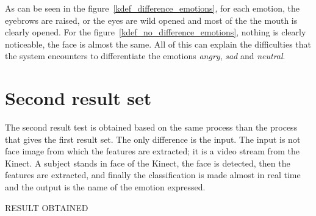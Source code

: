 \noindent As can be seen in the figure~\ref{kdef_difference_emotions}, for each emotion, the eyebrows are raised, or the eyes are wild opened and most of the the mouth is clearly opened. For the figure~\ref{kdef_no_difference_emotions}, nothing is clearly noticeable, the face is almost the same. All of this can explain the difficulties that the system encounters to differentiate the emotions \textit{angry}, \textit{sad} and \textit{neutral}.
\newline

\section{Second result set}

\vspace{\baselineskip}
\noindent The second result test is obtained based on the same process than the process that gives the first result set. The only difference is the input. The input is not face image from which the features are extracted; it is a video stream from the Kinect. A subject stands in face of the Kinect, the face is detected, then the features are extracted, and finally the classification is made almost in real time and the output is the name of the emotion expressed.
\newline

\noindent RESULT OBTAINED
\newline

